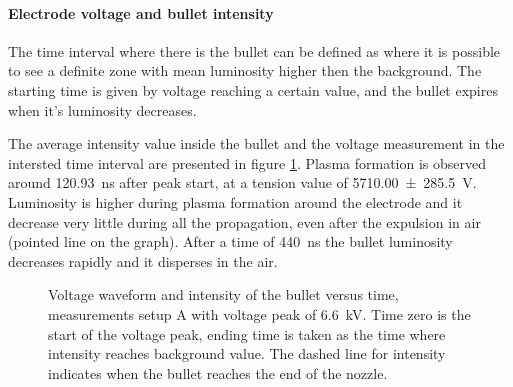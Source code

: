 \paragraph{Electrode voltage and bullet intensity}
The time interval where there is the bullet can be defined as where it is possible to see a definite zone with mean luminosity higher then the background. The starting time is given by voltage reaching a certain value, and the bullet expires when it's luminosity decreases.

The average intensity value inside the bullet and the voltage measurement in the intersted time interval are presented in figure \ref{fig:elio_d035_I}. Plasma formation is observed around \SI{120.93}{\nano\second} after peak start, at a tension value of \SI{5710.00(28550)}{\volt}. %
Luminosity is higher during plasma formation around the electrode and it decrease very little during all the propagation, even after the expulsion in air (pointed line on the graph). After a time of \SI{440}{\nano\second} the bullet luminosity decreases rapidly and it disperses in the air.
\begin{figure}
 \centering
 \hfill
 \caption{Voltage waveform and intensity of the bullet versus time, measurements setup A with voltage peak of \SI{6.6}{\kilo\volt}. Time zero is the start of the voltage peak, ending time is taken as the time where intensity reaches background value. The dashed line for intensity indicates when the bullet reaches the end of the nozzle.}
 \label{fig:elio_d035_I}
\end{figure}

